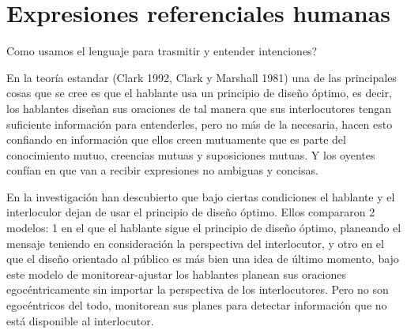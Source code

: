 \chapter{Expresiones referenciales humanas}

Como usamos el lenguaje para trasmitir y entender intenciones? 

En la teor\'ia estandar (Clark 1992, Clark y Marshall 1981) una de las principales cosas que se cree es que el hablante usa un principio de dise\~no \'optimo, es decir, los hablantes dise\~nan sus oraciones de tal manera que sus interlocutores tengan suficiente informaci\'on para entenderles, pero no m\'as de la necesaria, hacen esto confiando en informaci\'on que ellos creen mutuamente que es parte del conocimiento mutuo, creencias mutuas y suposiciones mutuas. Y los oyentes conf\'ian en que van a recibir expresiones no ambiguas y concisas. 

En la investigaci\'on \cite{keysar:Curr98} han descubierto que bajo ciertas condiciones el hablante y el interloculor dejan de usar el principio de dise\~no \'optimo. %
Ellos compararon 2 modelos: 1 en el que el hablante sigue el principio de dise\~no \'optimo, planeando el mensaje teniendo en consideraci\'on la perspectiva del interlocutor, y otro en el que el dise\~no orientado al p\'ublico es m\'as bien una idea de \'ultimo momento, bajo este modelo de monitorear-ajustar los hablantes planean sus oraciones egoc\'entricamente sin importar la perspectiva de los interlocutores. Pero no son egoc\'entricos del todo, monitorean sus planes para detectar informaci\'on que no est\'a disponible al interlocutor.

